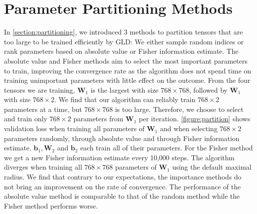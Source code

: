         
    

\section{Parameter Partitioning Methods} \label{section:partition}
In \autoref{section:partitioning}, we introduced 3 methods
to partition tensors that are too large 
to be trained efficiently by \ac{GLD}: We either sample
random indices or rank parameters based on absolute value 
or Fisher information estimate. The absolute value
and Fisher methods aim to select the most important 
parameters to train, improving the convergence rate as
the algorithm does not spend time on training unimportant
parameters with little effect on the outcome. 
From the four tensors we are training, 
$\mathbf{W}_1$ is the largest with size $768\times768$, 
followed by $\mathbf{W}_1$ with size $768\times2$.
We find that our algorithm can reliably train 
$768\times2$ parameters at a time, but $768\times768$ 
is too large. Therefore, we choose to select and train 
only $768\times2$
parameters from $\mathbf{W}_1$ per iteration. 
\autoref{figure:partition} shows validation loss
when training all parameters of $\mathbf{W}_1$ and when 
selecting $768\times2$ parameters randomly, through 
absolute value and through Fisher information estimate. 
$\mathbf{b}_1, \mathbf{W}_2$ and $\mathbf{b}_2$ each 
train all of their parameters. 
For the Fisher method we get a new Fisher information 
estimate every 10,000 steps. 
The algorithm diverges when training all $768\times768$
parameters of $\mathbf{W}_1$ using the default maximal 
radius. 
We find that contrary to our expectations, the importance 
methods do not bring an improvement on the rate of 
convergence. The performance of the absolute value method is 
comparable to that of the random method while the Fisher method 
performs worse. 

